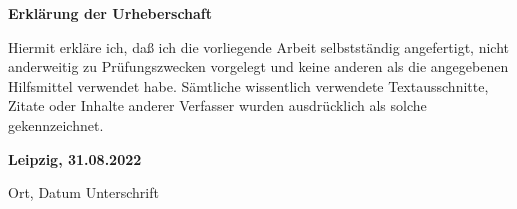 \documentclass[a4paper, monochrome]{article}
\begin{document}

















\clearpage

%
%
%
\setcounter{biburllcpenalty}{7000}
\setcounter{biburlucpenalty}{8000}


\printbibliography[title=Literatur, keyword=literature]
\printbibliography[title=Software, keyword=software]
\printbibliography[title=Online, keyword=online]

\clearpage

\textbf{Erklärung der Urheberschaft}

\vspace{1cm}

Hiermit erkläre ich, daß ich die vorliegende Arbeit
selbstständig angefertigt, nicht anderweitig zu Prüfungszwecken vorgelegt und
keine anderen als die angegebenen Hilfsmittel verwendet habe. Sämtliche 
wissentlich verwendete Textausschnitte, Zitate oder Inhalte anderer Verfasser 
wurden ausdrücklich als solche gekennzeichnet.

\vfill

\hspace{2cm} \textbf{Leipzig, 31.08.2022} \hspace{2cm} %


\vspace{1cm}

\hspace{2cm} Ort, Datum \hfill Unterschrift \hspace{2cm}
\end{document}
